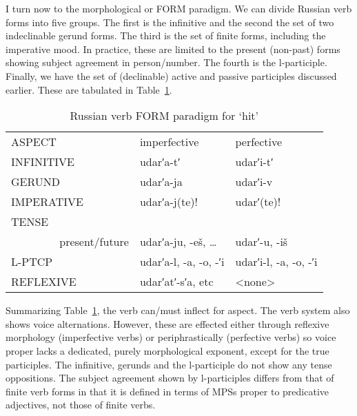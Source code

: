 \documentclass[output=paper,
modfonts
]{LSP/langsci}
\begin{document}

I turn now to the morphological or FORM paradigm. %
We can divide Russian verb forms into five groups. The first is the infinitive and the second the set of two indeclinable gerund forms. The third is the set of finite forms, including the imperative mood. In practice, these are limited to the present (non-past) forms showing subject agreement in person/number. The fourth is the l-participle. Finally, we have  the set of (declinable) active and passive participles discussed earlier. These are tabulated in Table~\ref{table:RussFORM}.

\begin{table} [h]
	\begin{center}
		\begin{tabular}{p{1em}p{6em}ll} 	\toprule
\multicolumn{2}{l}{ASPECT}		&imperfective					&perfective			\\ \cmidrule(rl){3-4}
\multicolumn{2}{l}{INFINITIVE}		&udarʹa-tʹ 						&udarʹi-tʹ 			\\
\multicolumn{2}{l}{GERUND}		&udarʹa-ja						&udarʹi-v			\\
\multicolumn{2}{l}{IMPERATIVE}	&udarʹa-j(te)!				&udarʹ(te)!			\\
TENSE													\\
	&present/future	&udarʹa-ju, -eš, \ldots				&udarʹ-u, -iš			\\
\multicolumn{2}{l}{L-PTCP}	&udarʹa-l, -a, -o, -ʹi				&udarʹi-l, -a, -o, -ʹi		\\
\multicolumn{2}{l}{REFLEXIVE}		&udarʹatʹ-sʹa, etc					&<none>	\\	\bottomrule
		\end{tabular}

\caption{Russian verb FORM paradigm for  ‘hit’}	\label{table:RussFORM}

	\end{center}
\end{table}

Summarizing Table~\ref{table:RussFORM}, the verb can/must inflect for aspect. The verb system also  shows voice alternations. However, these are effected either through  reflexive morphology (imperfective verbs) or periphrastically (perfective verbs) so voice proper lacks a dedicated, purely morphological exponent, except for the true participles. The infinitive, gerunds and the l-participle do not show any tense oppositions. The subject agreement shown by l-participles differs from that of finite verb forms in that it is defined in terms of MPSs proper to predicative adjectives, not those of finite verbs.
\end{document}

